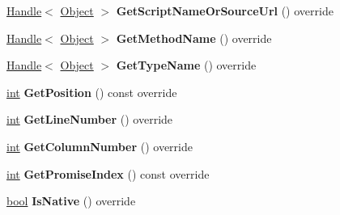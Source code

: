 \begin{DoxyCompactItemize}
\mbox{\label{classv8_1_1internal_1_1JSStackFrame_a76998a19e186eca80955b6b8d5663492}} 
\mbox{\hyperlink{classv8_1_1internal_1_1Handle}{Handle}}$<$ \mbox{\hyperlink{classv8_1_1internal_1_1Object}{Object}} $>$ {\bfseries Get\+Script\+Name\+Or\+Source\+Url} () override
\item 
\mbox{\label{classv8_1_1internal_1_1JSStackFrame_a51f5c68a1cc67b74e33bcc29121e2482}} 
\mbox{\hyperlink{classv8_1_1internal_1_1Handle}{Handle}}$<$ \mbox{\hyperlink{classv8_1_1internal_1_1Object}{Object}} $>$ {\bfseries Get\+Method\+Name} () override
\item 
\mbox{\label{classv8_1_1internal_1_1JSStackFrame_afbee4d536d15276836ac7b3a23f8e828}} 
\mbox{\hyperlink{classv8_1_1internal_1_1Handle}{Handle}}$<$ \mbox{\hyperlink{classv8_1_1internal_1_1Object}{Object}} $>$ {\bfseries Get\+Type\+Name} () override
\item 
\mbox{\label{classv8_1_1internal_1_1JSStackFrame_a2276308c97f109e226c9dcb0adecc219}} 
\mbox{\hyperlink{classint}{int}} {\bfseries Get\+Position} () const override
\item 
\mbox{\label{classv8_1_1internal_1_1JSStackFrame_affa6aed62033291a508a9b145b935b25}} 
\mbox{\hyperlink{classint}{int}} {\bfseries Get\+Line\+Number} () override
\item 
\mbox{\label{classv8_1_1internal_1_1JSStackFrame_acbd0ad5407f0fbc210c417247fb64e75}} 
\mbox{\hyperlink{classint}{int}} {\bfseries Get\+Column\+Number} () override
\item 
\mbox{\label{classv8_1_1internal_1_1JSStackFrame_a2c76291f70eba2df96731e7336bbb659}} 
\mbox{\hyperlink{classint}{int}} {\bfseries Get\+Promise\+Index} () const override
\item 
\mbox{\label{classv8_1_1internal_1_1JSStackFrame_a5a3cb3dcd0e4aa2046bcf0ad2daaef63}} 
\mbox{\hyperlink{classbool}{bool}} {\bfseries Is\+Native} () override
\item 

\end{DoxyCompactItemize}
